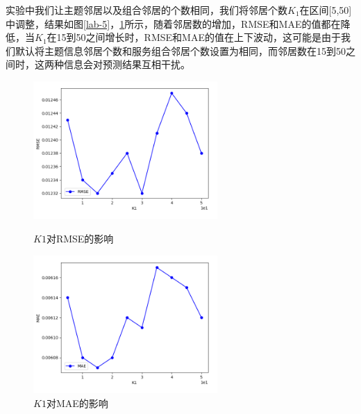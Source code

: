 \documentclass[master,winfonts]{njuthesis}
\begin{document}
\begin{arabicenum}
实验中我们让主题邻居以及组合邻居的个数相同，我们将邻居个数$K_1$在区间[5,50]中调整，结果如图\ref{lab-5}，\ref{lab-6}所示，随着邻居数的增加，RMSE和MAE的值都在降低，当$K_1$在15到50之间增长时，RMSE和MAE的值在上下波动，这可能是由于我们默认将主题信息邻居个数和服务组合邻居个数设置为相同，而邻居数在15到50之间时，这两种信息会对预测结果互相干扰。
\begin{figure}[htbp]
\centering
\begin{minipage}[t]{0.48\textwidth}
\centering
\includegraphics[width=7cm]{neighbour_a.png}
\caption{$K1$对RMSE的影响}\label{lab-5}
\end{minipage}
\begin{minipage}[t]{0.48\textwidth}
\centering
\includegraphics[width=7cm]{neighbour_b.png}
\caption{$K1$对MAE的影响}\label{lab-6}
\end{minipage}
\end{figure}


\end{arabicenum}
\end{document}
